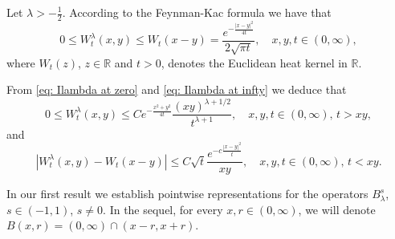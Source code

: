 \documentclass[a4paper,10pt, reqno]{amsart}
\theoremstyle{definition}
\theoremstyle{remark}
\numberwithin{equation}{section}
\begin{document}
Let $\lambda>-\frac{1}{2}$. According to the Feynman-Kac formula we have that
\begin{equation}\label{eq: heat Bessel FeynmanKac}
0\leq W_t^\lambda (x,y)\leq W_t(x-y)=\frac{e^{-\frac{|x-y|^2}{4t}}}{2\sqrt{\pi t}},\quad x,y,t\in (0,\infty),
\end{equation}
where $W_t(z)$, $z\in \mathbb R$ and $t>0$, denotes the Euclidean heat kernel in $\mathbb R$.

From \eqref{eq: Ilambda at zero} and \eqref{eq: Ilambda at infty} we deduce that
\begin{equation}\label{eq: heat Bessel t>xy}
0\leq W_t^\lambda(x,y) \leq Ce^{-\frac{x^2+y^2}{4t}}\frac{(xy)^{\lambda+1/2}}{t^{\lambda +1}},\quad x,y,t\in (0,\infty),\,t>xy,
\end{equation}
and
\begin{equation}\label{eq: heat Bessel comparison t<xy}
|W_t^\lambda (x,y)-W_t(x-y)|\leq C\sqrt{t}\frac{e^{-c\frac{|x-y|^2}{t}}}{xy}, \quad x,y,t\in (0,\infty),\,t<xy.
\end{equation}

In our first result we establish pointwise representations for the operators $B_\lambda^s$, $s\in (-1,1)$, $s\neq 0$. In the sequel, for every $x,r\in (0,\infty)$, we will denote $B(x,r)=(0,\infty)\cap (x-r,x+r)$.
\end{document}
